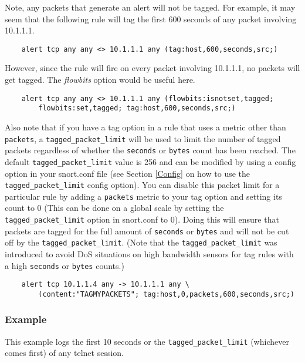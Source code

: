 \documentclass[english]{report}
\begin{document}
Note, any packets that generate an alert will not be tagged.  For example, it
may seem that the following rule will tag the first 600 seconds of any packet
involving 10.1.1.1.

\begin{verbatim}
    alert tcp any any <> 10.1.1.1 any (tag:host,600,seconds,src;)
\end{verbatim}

However, since the rule will fire on every packet involving 10.1.1.1, no
packets will get tagged.  The \emph{flowbits} option would be useful here.

\begin{verbatim}
    alert tcp any any <> 10.1.1.1 any (flowbits:isnotset,tagged; 
        flowbits:set,tagged; tag:host,600,seconds,src;)
\end{verbatim}

Also note that if you have a tag option in a rule that uses a metric other than
\texttt{packets}, a \texttt{tagged\_packet\_limit} will be used to limit the
number of tagged packets regardless of whether the \texttt{seconds} or
\texttt{bytes} count has been reached.  The default
\texttt{tagged\_packet\_limit} value is 256 and can be modified by using a
config option in your snort.conf file (see Section \ref{Config} on how to use
the \texttt{tagged\_packet\_limit} config option).  You can disable this packet
limit for a particular rule by adding a \texttt{packets} metric to your tag
option and setting its count to 0 (This can be done on a global scale by
setting the \texttt{tagged\_packet\_limit} option in snort.conf to 0).  Doing
this will ensure that packets are tagged for the full amount of
\texttt{seconds} or \texttt{bytes} and will not be cut off by the
\texttt{tagged\_packet\_limit}.  (Note that the \texttt{tagged\_packet\_limit}
was introduced to avoid DoS situations on high bandwidth sensors for tag rules
with a high \texttt{seconds} or \texttt{bytes} counts.)

\begin{verbatim}
    alert tcp 10.1.1.4 any -> 10.1.1.1 any \
        (content:"TAGMYPACKETS"; tag:host,0,packets,600,seconds,src;)
\end{verbatim}

\subsubsection{Example}

This example logs the first 10 seconds or the \texttt{tagged\_packet\_limit}
(whichever comes first) of any telnet session.
\end{document}
